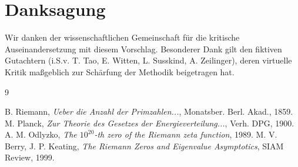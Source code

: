 \documentclass[11pt, a4paper]{article}
\begin{document}
	\section*{Danksagung}
	Wir danken der wissenschaftlichen Gemeinschaft für die kritische Auseinandersetzung mit diesem Vorschlag. Besonderer Dank gilt den fiktiven Gutachtern (i.S.v. T. Tao, E. Witten, L. Susskind, A. Zeilinger), deren virtuelle Kritik maßgeblich zur Schärfung der Methodik beigetragen hat.
	
	\begin{thebibliography}{9}
		
		B. Riemann, \textit{Ueber die Anzahl der Primzahlen...}, Monatsber. Berl. Akad., 1859.
		M. Planck, \textit{Zur Theorie des Gesetzes der Energieverteilung...}, Verh. DPG, 1900.
		A. M. Odlyzko, \textit{The $10^{20}$-th zero of the Riemann zeta function}, 1989.
		M. V. Berry, J. P. Keating, \textit{The Riemann Zeros and Eigenvalue Asymptotics}, SIAM Review, 1999.
		
	\end{thebibliography}
	
\end{document}
